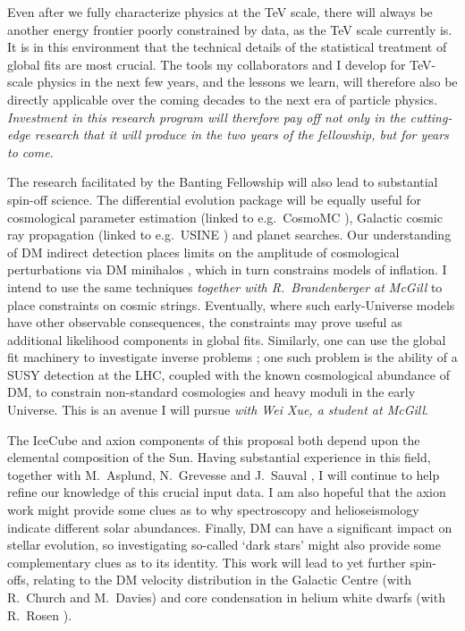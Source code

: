 \documentclass[10pt,oneside,twocolumn,a4paper]{article}
\begin{document}
Even after we fully characterize physics at the TeV scale, there will always be another energy frontier poorly constrained by data, as the TeV scale currently is.  It is in this environment that the technical details of the statistical treatment of global fits are most crucial.  The tools my collaborators and I develop for TeV-scale physics in the next few years, and the lessons we learn, will therefore also be directly applicable over the coming decades to the next era of particle physics.  \emph{Investment in this research program will therefore pay off not only in the cutting-edge research that it will produce in the two years of the fellowship, but for years to come.}

The research facilitated by the Banting Fellowship will also lead to substantial spin-off science.  The differential evolution package will be equally useful for cosmological parameter estimation (linked to e.g.~\textsf{CosmoMC} \cite{CosmoMC}), Galactic cosmic ray propagation (linked to e.g.~\textsf{USINE} \cite{Putze10}) and planet searches.  Our understanding of DM indirect detection places limits on the amplitude of cosmological perturbations via DM minihalos \cite{SS09,JG10,Bringmann11}, which in turn constrains models of inflation.  I intend to use the same techniques \textit{together with R.~Brandenberger at McGill} to place constraints on cosmic strings.  Eventually, where such early-Universe models have other observable consequences, the constraints may prove useful as additional likelihood components in global fits.  Similarly, one can use the global fit machinery to investigate inverse problems \cite{Roszkowski10,Akrami11DD}; one such problem is the ability of a SUSY detection at the LHC, coupled with the known cosmological abundance of DM, to constrain non-standard cosmologies and heavy moduli in the early Universe.  This is an avenue I will pursue \textit{with Wei Xue, a student at McGill}.

The IceCube and axion components of this proposal both depend upon the elemental composition of the Sun.  Having substantial experience in this field, together with M.~Asplund, N.~Grevesse and J.~Sauval \cite{ScottVII,Scott09Ni,AGSS}, I will continue to help refine our knowledge of this crucial input data.  I am also hopeful that the axion work might provide some clues as to why spectroscopy and helioseismology indicate different solar abundances.  Finally, DM can have a significant impact on stellar evolution, so investigating so-called `dark stars' \cite{Spolyar08,Iocco08a,Fairbairn08,Scott09,Zackrisson10a,Scott11} might also provide some complementary clues as to its identity.  This work will lead to yet further spin-offs, relating to the DM velocity distribution in the Galactic Centre (with R.~Church and M.~Davies) and core condensation in helium white dwarfs (with R.~Rosen \cite{Rosen08,Rosen10}).

\clearpage
\renewcommand\bibsection{}
\setcounter{page}{1}

\end{document}
